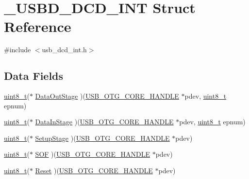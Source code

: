 \hypertarget{struct___u_s_b_d___d_c_d___i_n_t}{\section{\-\_\-\-U\-S\-B\-D\-\_\-\-D\-C\-D\-\_\-\-I\-N\-T Struct Reference}
\label{struct___u_s_b_d___d_c_d___i_n_t}
}


{\ttfamily \#include $<$usb\-\_\-dcd\-\_\-int.\-h$>$}

\subsection*{Data Fields}
\begin{DoxyCompactItemize}
\item 
\hyperlink{stdint_8h_aba7bc1797add20fe3efdf37ced1182c5}{uint8\-\_\-t}($\ast$ \hyperlink{struct___u_s_b_d___d_c_d___i_n_t_a74469828d056fc88273b238f0651160b}{Data\-Out\-Stage} )(\hyperlink{group___u_s_b___c_o_r_e___exported___types_gaf76054c11eb8a3367907aad7ae700e80}{U\-S\-B\-\_\-\-O\-T\-G\-\_\-\-C\-O\-R\-E\-\_\-\-H\-A\-N\-D\-L\-E} $\ast$pdev, \hyperlink{stdint_8h_aba7bc1797add20fe3efdf37ced1182c5}{uint8\-\_\-t} epnum)
\item 
\hyperlink{stdint_8h_aba7bc1797add20fe3efdf37ced1182c5}{uint8\-\_\-t}($\ast$ \hyperlink{struct___u_s_b_d___d_c_d___i_n_t_ac85090b851434424a4c5a06d483c11bb}{Data\-In\-Stage} )(\hyperlink{group___u_s_b___c_o_r_e___exported___types_gaf76054c11eb8a3367907aad7ae700e80}{U\-S\-B\-\_\-\-O\-T\-G\-\_\-\-C\-O\-R\-E\-\_\-\-H\-A\-N\-D\-L\-E} $\ast$pdev, \hyperlink{stdint_8h_aba7bc1797add20fe3efdf37ced1182c5}{uint8\-\_\-t} epnum)
\item 
\hyperlink{stdint_8h_aba7bc1797add20fe3efdf37ced1182c5}{uint8\-\_\-t}($\ast$ \hyperlink{struct___u_s_b_d___d_c_d___i_n_t_ae5f8f12aa08a893032ba6cc9e55f2ffa}{Setup\-Stage} )(\hyperlink{group___u_s_b___c_o_r_e___exported___types_gaf76054c11eb8a3367907aad7ae700e80}{U\-S\-B\-\_\-\-O\-T\-G\-\_\-\-C\-O\-R\-E\-\_\-\-H\-A\-N\-D\-L\-E} $\ast$pdev)
\item 
\hyperlink{stdint_8h_aba7bc1797add20fe3efdf37ced1182c5}{uint8\-\_\-t}($\ast$ \hyperlink{struct___u_s_b_d___d_c_d___i_n_t_ac5c247862c6c2c020fe0a21b21a4451c}{S\-O\-F} )(\hyperlink{group___u_s_b___c_o_r_e___exported___types_gaf76054c11eb8a3367907aad7ae700e80}{U\-S\-B\-\_\-\-O\-T\-G\-\_\-\-C\-O\-R\-E\-\_\-\-H\-A\-N\-D\-L\-E} $\ast$pdev)
\item 
\hyperlink{stdint_8h_aba7bc1797add20fe3efdf37ced1182c5}{uint8\-\_\-t}($\ast$ \hyperlink{struct___u_s_b_d___d_c_d___i_n_t_a5e42047c29c5b178a42ab6cd455249ff}{Reset} )(\hyperlink{group___u_s_b___c_o_r_e___exported___types_gaf76054c11eb8a3367907aad7ae700e80}{U\-S\-B\-\_\-\-O\-T\-G\-\_\-\-C\-O\-R\-E\-\_\-\-H\-A\-N\-D\-L\-E} $\ast$pdev)

\end{DoxyCompactItemize}
